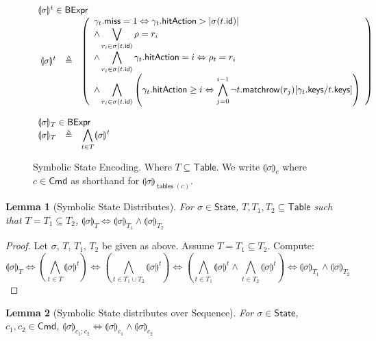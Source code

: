 \documentclass{article}
\newcommand{\BExpr}{\mathsf{BExpr}}
\newcommand{\Cmd}{\mathsf{Cmd}}
\newcommand{\Table}{\mathsf{Table}}
\newcommand{\State}{\mathsf{State}}
\newcommand{\keys}{\mathsf{keys}}
\newcommand{\id}{\mathsf{id}}
\newcommand{\hitAction}{\mathsf{hitAction}}
\newcommand{\miss}{\mathsf{miss}}
\newcommand{\state}[1]{\llparenthesis#1\rrparenthesis}
\newcommand{\matchrow}{\mathsf{matchrow}}
\newcommand{\tables}{\mathop{\mathsf{tables}}}
\theoremstyle{plain}
\newtheorem{lemma}{Lemma}
\theoremstyle{definition}
\theoremstyle{remark}
\begin{document}
\begin{figure}[htp]
  \[\begin{array}{r cl}
  \multicolumn{3}{l}{\state\sigma^t \in \BExpr} \\
  \state\sigma^t & \triangleq &
  \left(\begin{array}{>{\displaystyle}l}
  \gamma_t.\miss = 1 \Leftrightarrow \gamma_t.\hitAction > |\sigma(t.\id)| \\
  \wedge \bigvee_{r_i \in \sigma(t.\id)} \rho = r_i  \\
  \wedge \bigwedge_{r_i \in \sigma(t.\id)} \gamma_t.\hitAction = i \Leftrightarrow \rho_t = r_i \\
  \wedge \bigwedge_{r_i \in \sigma(t.\id)} \left(\gamma_t.\hitAction \geq i \Leftrightarrow \bigwedge_{j=0}^{i-1} \neg t.\matchrow(r_j)[\gamma_t.\keys/t.\keys]\right)\\
  \end{array}\right)\\\\

  \multicolumn{3}{l}{\state\sigma_T \in \BExpr} \\
  \state\sigma_T &\triangleq
  & \displaystyle\bigwedge_{ t \in T } \state\sigma^t
  \end{array}
  \]
  \caption{Symbolic State Encoding. Where $T \subseteq \Table$. We write
    $\state\sigma_c$ where $c \in \Cmd$ as shorthand for $\state\sigma_{\tables(c)}$.}
  \label{fig:state-encode}
\end{figure}

\begin{lemma}[Symbolic State Distributes]
  \label{lem:sigma-distrib}
  For $\sigma \in \State$, $T,T_1,T_2 \subseteq \Table$ such that $T = T_1 \subseteq T_2$,
  $\state\sigma_{T} \Leftrightarrow \state{\sigma}_{T_1}\wedge\state{\sigma}_{T_2}$
\end{lemma}

\begin{proof}
  Let $\sigma$, $T$, $T_1$, $T_2$ be given as above. Assume $T = T_1 \subseteq T_2$.
  Compute:
  \[\state\sigma_T\Leftrightarrow
  \left(\bigwedge_{t \in T} \state\sigma^t\right) \Leftrightarrow
  \left(\bigwedge_{t \in T_1 \cup T_2} \state\sigma^t\right) \Leftrightarrow
  \left(\bigwedge_{t \in T_1} \state\sigma^t \wedge \bigwedge_{t \in T_2}\state\sigma^t \right) \Leftrightarrow
  \state\sigma_{T_1} \wedge \state\sigma_{T_2}
  \]

\end{proof}


\begin{lemma}[Symbolic State distributes over Sequence]
  \label{lem:sigma-distrib-seq}
  For $\sigma \in \State$, $c_1,c_2 \in \Cmd$,
  $\state\sigma_{c_1;c_2} \Leftrightarrow \state{\sigma}_{c_1}\wedge\state{\sigma}_{c_2}$
\end{lemma}
\end{document}

